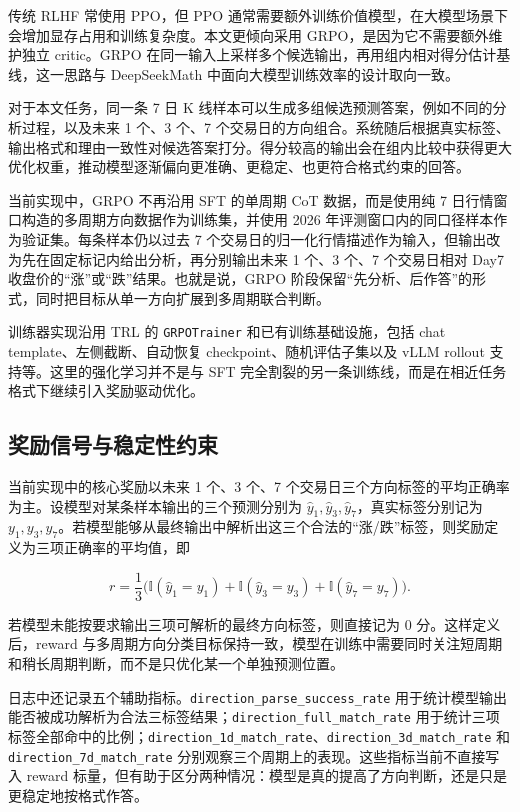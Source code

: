 传统 RLHF 常使用 PPO，但 PPO 通常需要额外训练价值模型，在大模型场景下会增加显存占用和训练复杂度\cite{schulman2017ppo,ouyang2022instructgpt}。本文更倾向采用 GRPO，是因为它不需要额外维护独立 critic。GRPO 在同一输入上采样多个候选输出，再用组内相对得分估计基线，这一思路与 DeepSeekMath 中面向大模型训练效率的设计取向一致\cite{shao2024deepseekmath}。

对于本文任务，同一条 7 日 K 线样本可以生成多组候选预测答案，例如不同的分析过程，以及未来 1 个、3 个、7 个交易日的方向组合。系统随后根据真实标签、输出格式和理由一致性对候选答案打分。得分较高的输出会在组内比较中获得更大优化权重，推动模型逐渐偏向更准确、更稳定、也更符合格式约束的回答。

当前实现中，GRPO 不再沿用 SFT 的单周期 CoT 数据，而是使用纯 7 日行情窗口构造的多周期方向数据作为训练集，并使用 2026 年评测窗口内的同口径样本作为验证集。每条样本仍以过去 7 个交易日的归一化行情描述作为输入，但输出改为先在固定标记内给出分析，再分别输出未来 1 个、3 个、7 个交易日相对 Day7 收盘价的“涨”或“跌”结果。也就是说，GRPO 阶段保留“先分析、后作答”的形式，同时把目标从单一方向扩展到多周期联合判断。

训练器实现沿用 TRL 的 \texttt{GRPOTrainer} 和已有训练基础设施，包括 chat template、左侧截断、自动恢复 checkpoint、随机评估子集以及 vLLM rollout 支持等。这里的强化学习并不是与 SFT 完全割裂的另一条训练线，而是在相近任务格式下继续引入奖励驱动优化。

\subsection{奖励信号与稳定性约束}

当前实现中的核心奖励以未来 1 个、3 个、7 个交易日三个方向标签的平均正确率为主。设模型对某条样本输出的三个预测分别为 \(\hat{y}_1,\hat{y}_3,\hat{y}_7\)，真实标签分别记为 \(y_1,y_3,y_7\)。若模型能够从最终输出中解析出这三个合法的“涨/跌”标签，则奖励定义为三项正确率的平均值，即

\[
r=\frac{1}{3}\Big(\mathbb{I}(\hat{y}_1=y_1)+\mathbb{I}(\hat{y}_3=y_3)+\mathbb{I}(\hat{y}_7=y_7)\Big).
\]

若模型未能按要求输出三项可解析的最终方向标签，则直接记为 0 分。这样定义后，reward 与多周期方向分类目标保持一致，模型在训练中需要同时关注短周期和稍长周期判断，而不是只优化某一个单独预测位置。

日志中还记录五个辅助指标。\texttt{direction\_parse\_success\_rate} 用于统计模型输出能否被成功解析为合法三标签结果；\texttt{direction\_full\_match\_rate} 用于统计三项标签全部命中的比例；\texttt{direction\_1d\_match\_rate}、\texttt{direction\_3d\_match\_rate} 和 \texttt{direction\_7d\_match\_rate} 分别观察三个周期上的表现。这些指标当前不直接写入 reward 标量，但有助于区分两种情况：模型是真的提高了方向判断，还是只是更稳定地按格式作答。

